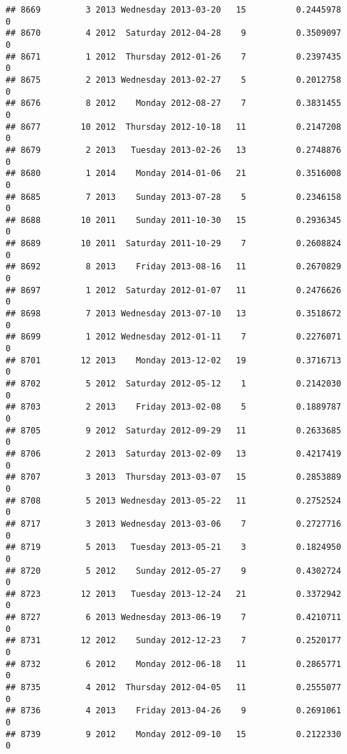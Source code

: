 \documentclass[
]{article}
\begin{document}
\begin{verbatim}
## 8669         3 2013 Wednesday 2013-03-20   15          0.2445978             0
## 8670         4 2012  Saturday 2012-04-28    9          0.3509097             0
## 8671         1 2012  Thursday 2012-01-26    7          0.2397435             0
## 8675         2 2013 Wednesday 2013-02-27    5          0.2012758             0
## 8676         8 2012    Monday 2012-08-27    7          0.3831455             0
## 8677        10 2012  Thursday 2012-10-18   11          0.2147208             0
## 8679         2 2013   Tuesday 2013-02-26   13          0.2748876             0
## 8680         1 2014    Monday 2014-01-06   21          0.3516008             0
## 8685         7 2013    Sunday 2013-07-28    5          0.2346158             0
## 8688        10 2011    Sunday 2011-10-30   15          0.2936345             0
## 8689        10 2011  Saturday 2011-10-29    7          0.2608824             0
## 8692         8 2013    Friday 2013-08-16   11          0.2670829             0
## 8697         1 2012  Saturday 2012-01-07   11          0.2476626             0
## 8698         7 2013 Wednesday 2013-07-10   13          0.3518672             0
## 8699         1 2012 Wednesday 2012-01-11    7          0.2276071             0
## 8701        12 2013    Monday 2013-12-02   19          0.3716713             0
## 8702         5 2012  Saturday 2012-05-12    1          0.2142030             0
## 8703         2 2013    Friday 2013-02-08    5          0.1889787             0
## 8705         9 2012  Saturday 2012-09-29   11          0.2633685             0
## 8706         2 2013  Saturday 2013-02-09   13          0.4217419             0
## 8707         3 2013  Thursday 2013-03-07   15          0.2853889             0
## 8708         5 2013 Wednesday 2013-05-22   11          0.2752524             0
## 8717         3 2013 Wednesday 2013-03-06    7          0.2727716             0
## 8719         5 2013   Tuesday 2013-05-21    3          0.1824950             0
## 8720         5 2012    Sunday 2012-05-27    9          0.4302724             0
## 8723        12 2013   Tuesday 2013-12-24   21          0.3372942             0
## 8727         6 2013 Wednesday 2013-06-19    7          0.4210711             0
## 8731        12 2012    Sunday 2012-12-23    7          0.2520177             0
## 8732         6 2012    Monday 2012-06-18   11          0.2865771             0
## 8735         4 2012  Thursday 2012-04-05   11          0.2555077             0
## 8736         4 2013    Friday 2013-04-26    9          0.2691061             0
## 8739         9 2012    Monday 2012-09-10   15          0.2122330             0

\end{verbatim}
\end{document}
